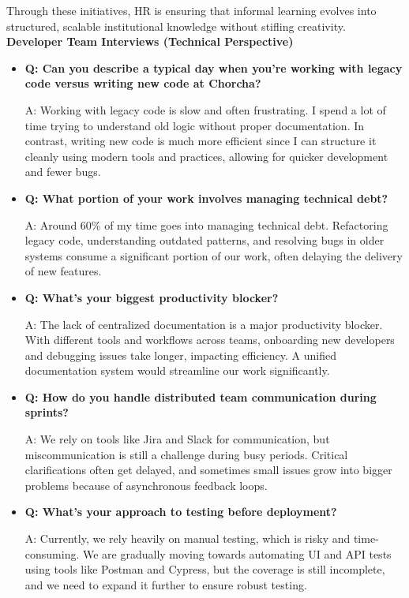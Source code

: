 \documentclass[12pt,a4paper,oneside]{book}
\begin{document}
Through these initiatives, HR is ensuring that informal learning evolves into structured, scalable institutional knowledge without stifling creativity.\\


\textbf{Developer Team Interviews (Technical Perspective)}\\

\begin{itemize}
  \item \textbf{Q: Can you describe a typical day when you’re working with legacy code versus writing new code at Chorcha?}

A: Working with legacy code is slow and often frustrating. I spend a lot of time trying to understand old logic without proper documentation. In contrast, writing new code is much more efficient since I can structure it cleanly using modern tools and practices, allowing for quicker development and fewer bugs.

\item \textbf{Q: What portion of your work involves managing technical debt?} 

A: Around 60\% of my time goes into managing technical debt. Refactoring legacy code, understanding outdated patterns, and resolving bugs in older systems consume a significant portion of our work, often delaying the delivery of new features.

\item \textbf{Q: What’s your biggest productivity blocker?}

A: The lack of centralized documentation is a major productivity blocker. With different tools and workflows across teams, onboarding new developers and debugging issues take longer, impacting efficiency. A unified documentation system would streamline our work significantly.

\item \textbf{Q: How do you handle distributed team communication during sprints?}

A: We rely on tools like Jira and Slack for communication, but miscommunication is still a challenge during busy periods. Critical clarifications often get delayed, and sometimes small issues grow into bigger problems because of asynchronous feedback loops.

\item \textbf{Q: What’s your approach to testing before deployment?} 

A: Currently, we rely heavily on manual testing, which is risky and time-consuming. We are gradually moving towards automating UI and API tests using tools like Postman and Cypress, but the coverage is still incomplete, and we need to expand it further to ensure robust testing.


\end{itemize}
\end{document}
